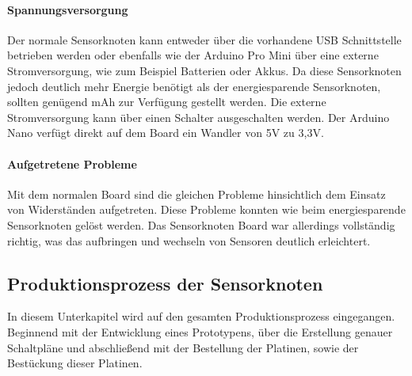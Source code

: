 \paragraph{Spannungsversorgung} Der normale Sensorknoten kann entweder über die vorhandene USB Schnittstelle betrieben werden oder ebenfalls wie der Arduino Pro Mini über eine externe Stromversorgung, wie zum Beispiel Batterien oder Akkus. Da diese Sensorknoten jedoch deutlich mehr Energie benötigt als der energiesparende Sensorknoten, sollten genügend mAh zur Verfügung gestellt werden. Die externe Stromversorgung kann über einen Schalter ausgeschalten werden. Der Arduino Nano verfügt direkt auf dem Board ein Wandler von 5V zu 3,3V.
\paragraph{Aufgetretene Probleme} Mit dem normalen Board sind die gleichen Probleme hinsichtlich dem Einsatz von Widerständen aufgetreten. Diese Probleme konnten wie beim energiesparende Sensorknoten gelöst werden. Das Sensorknoten Board war allerdings vollständig richtig, was das aufbringen und wechseln von Sensoren deutlich erleichtert.
\subsection{Produktionsprozess der Sensorknoten}
\label{sec:ProduktionsprozessSensornoten}
In diesem Unterkapitel wird auf den gesamten Produktionsprozess eingegangen. Beginnend mit der Entwicklung eines Prototypens, über die Erstellung genauer Schaltpläne und abschließend mit der Bestellung der Platinen, sowie der Bestückung dieser Platinen.
